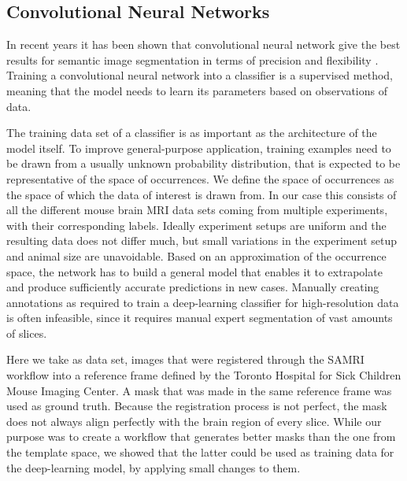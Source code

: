 \subsection{Convolutional Neural Networks} \label{sec:Convolutional Neural Networks}
In recent years it has been shown that convolutional neural network give the best results for semantic image segmentation in terms of precision and flexibility \cite{geng_survey_2018} \cite{ronneberger_u-net:_2015}.
Training a convolutional neural network into a classifier is a supervised method, meaning that the model needs to learn its parameters based on observations of data.

The training data set of a classifier is as important as the architecture of the model itself.
To improve general-purpose application, training examples need to be drawn from a usually unknown probability distribution, that is expected to be representative of the space of occurrences.
We define the space of occurrences as the space of which the data of interest is drawn from.
In our case this consists of all the different mouse brain MRI data sets coming from multiple experiments, with their corresponding labels. 
Ideally experiment setups are uniform and the resulting data does not differ much, but small variations in the experiment setup and animal size are unavoidable.
Based on an approximation of the occurrence space, the network has to build a general model that enables it to extrapolate and produce sufficiently accurate predictions in new cases.
Manually creating annotations as required to train a deep-learning classifier for high-resolution data is often infeasible, since it requires manual expert segmentation of vast amounts of slices.

Here we take as data set, images that were registered through the SAMRI workflow into a reference frame defined by the Toronto Hospital for Sick Children Mouse Imaging Center. %
A mask that was made in the same reference frame was used as ground truth.
Because the registration process is not perfect, the mask does not always align perfectly with the brain region of every slice.
While our purpose was to create a workflow that generates better masks than the one from the template space, we showed that the latter could be used as training data for the deep-learning model, by applying small changes to them.